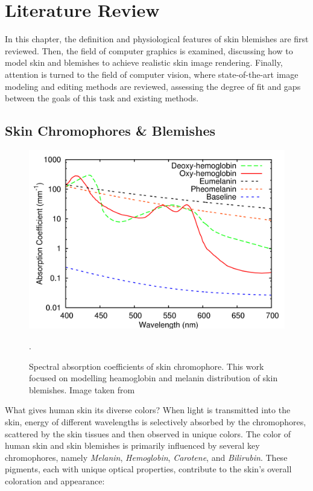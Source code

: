 
\chapter{Literature Review}
\begin{spacing}{1.5}
\setlength{\parskip}{0.3in}

In this chapter, the definition and physiological features of skin blemishes are first reviewed. Then, the field of computer graphics is examined, discussing how to model skin and blemishes to achieve realistic skin image rendering. Finally, attention is turned to the field of computer vision, where state-of-the-art image modeling and editing methods are reviewed, assessing the degree of fit and gaps between the goals of this task and existing methods.

\section{Skin Chromophores \& Blemishes}
\begin{figure}
    \centering
    \includegraphics[width=0.9\columnwidth]{Chapter2/HM_abs.png}
    \caption{Spectral absorption coefficients of skin chromophore. This work focused on modelling heamoglobin and melanin distribution of skin blemishes. Image taken from\cite{10.5555/2383894.2383946}}.
    \label{fig:hm_abs}
\end{figure}

What gives human skin its diverse colors? When light is transmitted into the skin, energy of different wavelengths is selectively absorbed by the chromophores, scattered by the skin tissues and then observed in unique colors. The color of human skin and skin blemishes is primarily influenced by several key chromophores, namely \textit{Melanin}, \textit{Hemoglobin}, \textit{Carotene}, and \textit{Bilirubin}. These pigments, each with unique optical properties, contribute to the skin's overall coloration and appearance:


\end{spacing}

